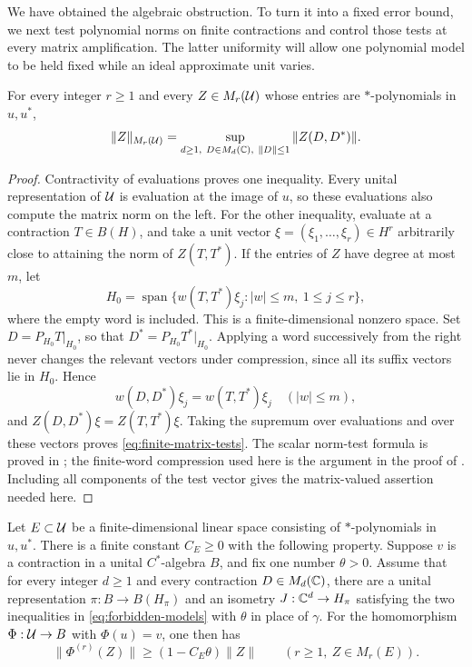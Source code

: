 We have obtained the algebraic obstruction.  To turn it into a fixed
error bound, we next test polynomial norms on finite contractions and
control those tests at every matrix amplification.  The latter
uniformity will allow one polynomial model to be held fixed while an
ideal approximate unit varies.

\begin{lemma}\label{lem:finite-matrix-tests}
For every integer $r\geq1$ and every $Z\in M_r(\mathcal U)$ whose entries are
$*$-polynomials in $u,u^*$,
\begin{equation}\label{eq:finite-matrix-tests}
 \|Z\|_{M_r(\mathcal U)}
 =\sup_{d\geq1,\ D\in M_d(\mathbb C),\ \|D\|\leq1}\|Z(D,D^*)\|.
\end{equation}
\end{lemma}

\begin{proof}
Contractivity of evaluations proves one inequality.  Every unital
representation of $\mathcal U$ is evaluation at the image of $u$, so these
evaluations also compute the matrix norm on the left.  For the other
inequality, evaluate at a contraction $T\in B(H)$, and take a unit vector
$\xi=(\xi_1,\ldots,\xi_r)\in H^r$ arbitrarily close to attaining
the norm of $Z(T,T^*)$.  If the entries of $Z$ have degree at most
$m$, let
\[
 H_0=\operatorname{span}
 \{w(T,T^*)\xi_j:|w|\leq m,\ 1\leq j\leq r\},
\]
where the empty word is included.  This is a finite-dimensional
nonzero space.  Set $D=P_{H_0}T|_{H_0}$, so that
$D^*=P_{H_0}T^*|_{H_0}$.  Applying a word successively from the right
never changes the relevant vectors under compression, since all its
suffix vectors lie in $H_0$.  Hence
\[
 w(D,D^*)\xi_j=w(T,T^*)\xi_j\quad (|w|\leq m),
\]
and $Z(D,D^*)\xi=Z(T,T^*)\xi$.  Taking the supremum over evaluations
and over these vectors proves \eqref{eq:finite-matrix-tests}.
The scalar norm-test formula is proved in \cite[Proposition~2.2]{CS};
the finite-word compression used here is the argument in the proof of
\cite[Theorem~3.1]{CS}. Including all components of the test vector
gives the matrix-valued assertion needed here.
\end{proof}

\begin{lemma}\label{lem:uniform-matrix-bound}
Let $E\subset\mathcal U$ be a finite-dimensional linear space consisting of
$*$-polynomials in $u,u^*$.  There is a finite constant $C_E\geq0$
with the following property.  Suppose $v$ is a contraction in a unital
$C^*$-algebra $B$, and fix one number $\theta>0$.  Assume that for every
integer $d\geq1$ and every contraction $D\in M_d(\mathbb C)$, there are a unital
representation $\pi:B\to B(H_\pi)$ and an isometry $J:\mathbb C^d\to H_\pi$
satisfying the two inequalities in \eqref{eq:forbidden-models} with
$\theta$ in place of $\gamma$.
For the homomorphism $\Phi:\mathcal U\to B$ with $\Phi(u)=v$, one then has
\begin{equation}\label{eq:all-amplification-bound}
 \|\Phi^{(r)}(Z)\|\geq(1-C_E\theta)\|Z\|
 \qquad (r\geq1,\ Z\in M_r(E)).
\end{equation}
\end{lemma}

